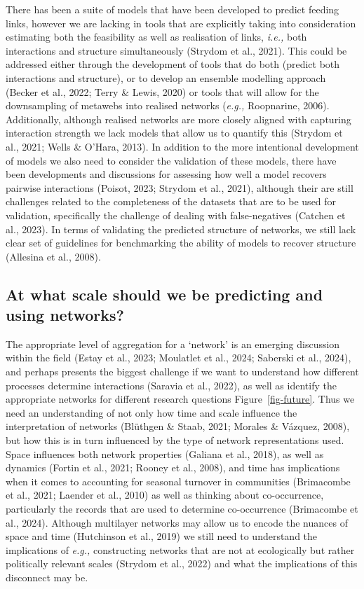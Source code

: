 \documentclass[
]{article}
\begin{document}
There has been a suite of models that have been developed to predict
feeding links, however we are lacking in tools that are explicitly
taking into consideration estimating both the feasibility as well as
realisation of links, \emph{i.e.,} both interactions and structure
simultaneously (Strydom et al., 2021). This could be addressed either
through the development of tools that do both (predict both interactions
and structure), or to develop an ensemble modelling approach (Becker et
al., 2022; Terry \& Lewis, 2020) or tools that will allow for the
downsampling of metawebs into realised networks (\emph{e.g.,}
Roopnarine, 2006). Additionally, although realised networks are more
closely aligned with capturing interaction strength we lack models that
allow us to quantify this (Strydom et al., 2021; Wells \& O'Hara, 2013).
In addition to the more intentional development of models we also need
to consider the validation of these models, there have been developments
and discussions for assessing how well a model recovers pairwise
interactions (Poisot, 2023; Strydom et al., 2021), although their are
still challenges related to the completeness of the datasets that are to
be used for validation, specifically the challenge of dealing with
false-negatives (Catchen et al., 2023). In terms of validating the
predicted structure of networks, we still lack clear set of guidelines
for benchmarking the ability of models to recover structure (Allesina et
al., 2008).

\subsection{At what scale should we be predicting and using
networks?}\label{at-what-scale-should-we-be-predicting-and-using-networks}

The appropriate level of aggregation for a `network' is an emerging
discussion within the field (Estay et al., 2023; Moulatlet et al., 2024;
Saberski et al., 2024), and perhaps presents the biggest challenge if we
want to understand how different processes determine interactions
(Saravia et al., 2022), as well as identify the appropriate networks for
different research questions Figure~\ref{fig-future}. Thus we need an
understanding of not only how time and scale influence the
interpretation of networks (Blüthgen \& Staab, 2021; Morales \& Vázquez,
2008), but how this is in turn influenced by the type of network
representations used. Space influences both network properties (Galiana
et al., 2018), as well as dynamics (Fortin et al., 2021; Rooney et al.,
2008), and time has implications when it comes to accounting for
seasonal turnover in communities (Brimacombe et al., 2021; Laender et
al., 2010) as well as thinking about co-occurrence, particularly the
records that are used to determine co-occurrence (Brimacombe et al.,
2024). Although multilayer networks may allow us to encode the nuances
of space and time (Hutchinson et al., 2019) we still need to understand
the implications of \emph{e.g.,} constructing networks that are not at
ecologically but rather politically relevant scales (Strydom et al.,
2022) and what the implications of this disconnect may be.
\end{document}
